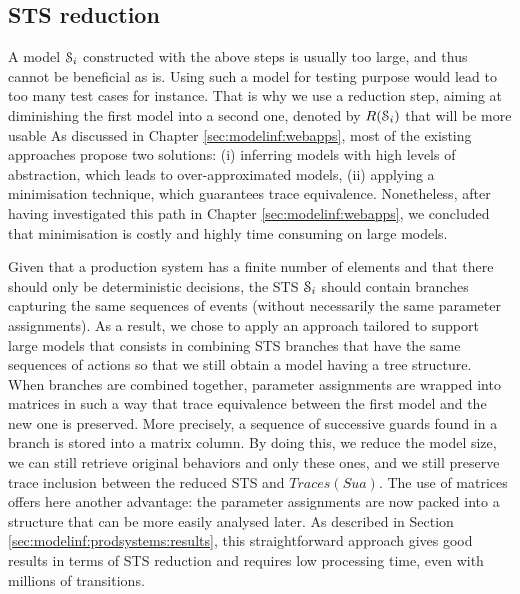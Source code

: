 \subsection{STS reduction}
\label{sec:modelinf:prodsystems:reduction}

A model $\EuScript{S}_i$ constructed with the above steps is
usually too large, and thus cannot be beneficial as is. Using
such a model for testing purpose would lead to too many test
cases for instance. That is why we use a reduction step, aiming
at diminishing the first model into a second one, denoted by
$R(\EuScript{S}_i)$ that will be more usable As discussed in
Chapter \ref{sec:modelinf:webapps}, most of the existing
approaches propose two solutions: (i) inferring models with high
levels of abstraction, which leads to over-approximated models,
(ii) applying a minimisation technique, which guarantees trace
equivalence.  Nonetheless, after having investigated this path in
Chapter \ref{sec:modelinf:webapps}, we concluded that
minimisation is costly and highly time consuming on large models.

Given that a production system has a finite number of elements
and that there should only be deterministic decisions, the STS
$\EuScript{S}_i$ should contain branches capturing the same
sequences of events (without necessarily the same parameter
assignments).  As a result, we chose to apply an approach
tailored to support large models that
consists in combining STS branches that have the same
sequences of actions so that we still obtain a model having a
tree structure. When branches are combined together, parameter
assignments are wrapped into matrices in such a way that trace
equivalence between the first model and the new one is preserved.
More precisely, a sequence of successive guards found in a branch
is stored into a matrix column. By doing this, we reduce the
model size, we can still retrieve original behaviors and only
these ones, and we still preserve trace inclusion between the
reduced STS and $Traces(Sua)$.
The use of matrices offers here another advantage: the parameter
assignments are now packed into a structure that can be more
easily analysed later. As described in Section
\ref{sec:modelinf:prodsystems:results}, this straightforward
approach gives good results in terms of STS reduction and
requires low processing time, even with millions of transitions.

